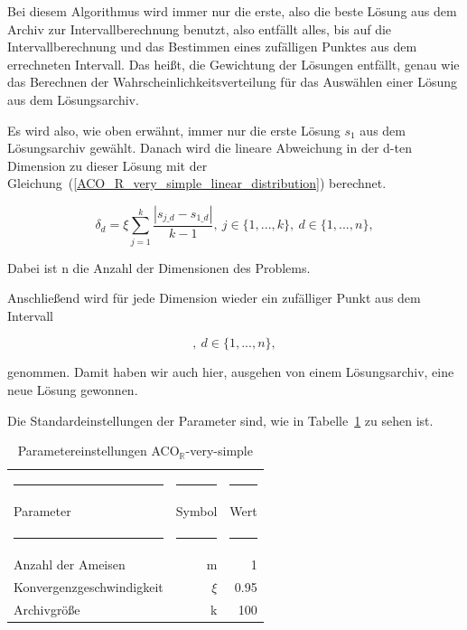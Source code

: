 \documentclass[fontsize=12, a4aper]{scrartcl}
\begin{document}
	\noindent Bei diesem Algorithmus wird immer nur die erste, also die beste Lösung aus dem Archiv zur Intervallberechnung benutzt, also entfällt alles, bis auf die Intervallberechnung und das Bestimmen eines zufälligen Punktes aus dem errechneten Intervall. Das heißt, die Gewichtung der Lösungen entfällt, genau wie das Berechnen der Wahrscheinlichkeitsverteilung für das Auswählen einer Lösung aus dem Lösungsarchiv.\hfill\newline
	
	\noindent Es wird also, wie oben erwähnt, immer nur die erste Lösung \(s_1\) aus dem Lösungsarchiv gewählt. Danach wird die lineare Abweichung in der d-ten Dimension zu dieser Lösung mit der Gleichung~(\ref{ACO_R_very_simple_linear_distribution}) berechnet.
	
	\begin{equation} \label{ACO_R_very_simple_linear_distribution}
	\delta_d = \xi\sum_{j=1}^{k} \frac{|s_{j\_d}-s_{1\_d}|}{k-1}, ~ j \in \{1, ..., k\}, ~ d \in \{1, ..., n\},
	\end{equation}
	
	\noindent Dabei ist n die Anzahl der Dimensionen des Problems.\hfill\newline
	
	\noindent Anschließend wird für jede Dimension wieder ein zufälliger Punkt aus dem Intervall
	
	\begin{equation}
	[s_d - \delta_d, s_d + \delta_d], ~ d \in \{1, ..., n\},
	\end{equation}
	
	\noindent genommen. Damit haben wir auch hier, ausgehen von einem Lösungsarchiv, eine neue Lösung gewonnen.\hfill\newline
	
	\noindent Die Standardeinstellungen der Parameter sind, wie in Tabelle~\ref{ACO_R_very_simple_Parametereinstellungen} zu sehen ist.
	
	\begin{table}[H]
		\fontsize{10pt}{12pt}
		
		\caption{Parametereinstellungen ACO\(_{\mathbb{R}}\)-very-simple}
		\label{ACO_R_very_simple_Parametereinstellungen}
		
		\begin{tabularx}{\textwidth}{l|r|r}
			
			\rule{4.6cm}{0.4pt} & \rule{4.6cm}{0.4pt}& \rule{4.6cm}{0.4pt}\\
			
			Parameter & Symbol & Wert\\
			
			\rule{4.6cm}{0.4pt} & \rule{4.6cm}{0.4pt}& \rule{4.6cm}{0.4pt}\\
			
			Anzahl der Ameisen & m & 1\\
			Konvergenzgeschwindigkeit & \(\xi\) & 0.95\\
			Archivgröße & k & 100
			
			
		\end{tabularx}
		
	\end{table}
\end{document}
